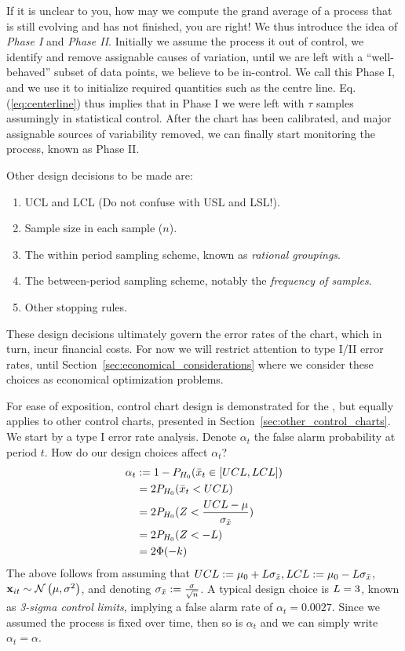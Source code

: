 If it is unclear to you, how may we compute the grand average of a process that is still evolving and has not finished, you are right! We thus introduce the idea of \emph{Phase I} and \emph{Phase II}. 
Initially we assume the process it out of control, we identify and remove assignable causes of variation, until we are left with a ``well-behaved'' subset of data points, we believe to be in-control. We call this Phase I, and we use it to initialize required quantities such as the centre line. 
Eq.(\ref{eq:centerline}) thus implies that in Phase I we were left with $\tau$ samples assumingly in statistical control.
After the chart has been calibrated, and major assignable sources of variability removed, we can finally start monitoring the process, known as Phase II.



Other design decisions to be made are:
\begin{enumerate}
\item UCL and LCL (Do not confuse with USL and LSL!).
\item Sample size in each sample ($n$).
\item The within period sampling scheme, known as \emph{rational groupings}.
\item The between-period sampling scheme, notably the \emph{frequency of samples}. 
\item Other stopping rules.
\end{enumerate}
These design decisions ultimately govern the error rates of the chart, which in turn, incur financial costs. 
For now we will restrict attention to type I/II error rates, until Section~\ref{sec:economical_considerations} where we consider these choices as economical optimization problems.

For ease of exposition, control chart design is demonstrated for the \barxChart, but equally applies to other control charts, presented in Section~\ref{sec:other_control_charts}.
We start by a type I error rate analysis. 
Denote $\alpha_t$ the false alarm probability at period $t$.
How do our design choices affect $\alpha_t$?
\begin{align}
	\alpha_t &:= 1-P_{H_0}(\bar{x}_t \in [UCL,LCL]) \\
	&= 2 P_{H_0}(\bar{x}_t<UCL) \\
	&= 2 P_{H_0}(Z<\frac{UCL-\mu}{\sigma_{\bar{x}}}) \\
	&= 2 P_{H_0}(Z < -L) \\
	&= 2 \Phi(-k)
\end{align}
The above follows from assuming that $UCL:=\mu_0 + L \sigma_{\bar{x}}, LCL:= \mu_0 - L \sigma_{\bar{x}}$, $\mathbf{x}_{it}\sim \mathcal{N}\left(\mu,\sigma^2\right)$, and denoting $\sigma_{\bar{x}}:= \frac{\sigma}{\sqrt{n}}$.
A typical design choice is $L=3$, known as \emph{3-sigma control limits}, implying a false alarm rate of $\alpha_t=0.0027$.
Since we assumed the process is fixed over time, then so is $\alpha_t$ and we can simply write $\alpha_t=\alpha$.

